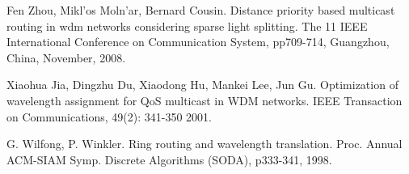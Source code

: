 \documentclass[conference]{IEEEtran}
\begin{document}
\begin{thebibliography}{1}
Fen Zhou, Mikl\a'os Moln\a'ar, Bernard Cousin. Distance priority based multicast routing in wdm networks considering sparse light splitting. The 11 IEEE International Conference on Communication System, pp709-714, Guangzhou, China, November, 2008.

Xiaohua Jia, Dingzhu Du, Xiaodong Hu, Mankei Lee, Jun Gu. Optimization of wavelength assignment for QoS multicast in WDM networks. IEEE Transaction on Communications, 49(2): 341-350 2001.

G. Wilfong, P. Winkler. Ring routing and wavelength translation. Proc.  Annual ACM-SIAM Symp. Discrete Algorithms (SODA), p333-341, 1998.

\end{thebibliography}
\end{document}
